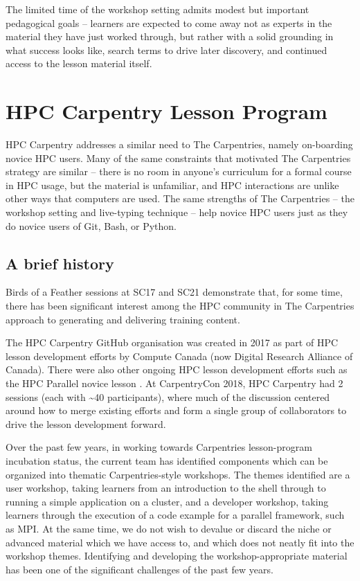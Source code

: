 The limited time of the workshop setting admits modest but important pedagogical goals -- learners are expected to come away not as experts in the material they have just worked through, but rather with a solid grounding in what success looks like, search terms to drive later discovery, and continued access to the lesson material itself.

\section{HPC Carpentry Lesson Program}

HPC Carpentry addresses a similar need to The Carpentries, namely on-boarding novice HPC users. Many of the same constraints that motivated The Carpentries strategy are similar -- there is no room in anyone's curriculum for a formal course in HPC usage, but the material is unfamiliar, and HPC interactions are unlike other ways that computers are used. The same strengths of The Carpentries -- the workshop setting and live-typing technique -- help novice HPC users just as they do novice users of Git, Bash, or Python.

\subsection{A brief history}

Birds of a Feather sessions at SC17 \cite{bofSC2017} and SC21 \cite{bofSC2021} demonstrate that, for some time, there has been significant interest among the HPC community in The Carpentries approach to generating and delivering training content.

The HPC Carpentry GitHub organisation was created in 2017 as part of HPC lesson development efforts by Compute Canada (now Digital Research Alliance of Canada). There were also other ongoing HPC lesson development efforts such as the HPC Parallel novice lesson \cite{peter_steinbach_2021_4525377}. At CarpentryCon 2018, HPC Carpentry had 2 sessions \cite{cconBreakout, cconWorkshop} (each with \textasciitilde40 participants), where much of the discussion centered around how to merge existing efforts and form a single group of collaborators to drive the lesson development forward.

Over the past few years, in working towards Carpentries lesson-program incubation status, the current team has identified components which can be organized into thematic Carpentries-style workshops. The themes identified are a user workshop, taking learners from an introduction to the shell through to running a simple application on a cluster, and a developer workshop, taking learners through the execution of a code example for a parallel framework, such as MPI. At the same time, we do not wish to devalue or discard the  niche or advanced material which we have access to, and which does not neatly fit into the workshop themes. Identifying and developing the workshop-appropriate material has been one of the significant challenges of the past few years.

